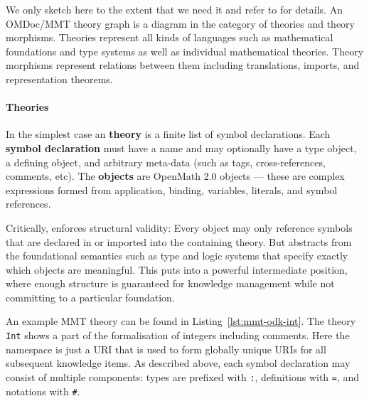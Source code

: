 We only sketch \MMT here to the extent that we need it and refer to \cite{RabKoh:WSMSML13} for details.
An OMDoc/MMT theory graph is a diagram in the category of \MMT theories and theory morphisms.
Theories represent all kinds of languages such as mathematical foundations and type systems as well as individual mathematical theories.
Theory morphisms represent relations between them including translations, imports, and representation theorems.

\paragraph{Theories}
In the simplest case an \MMT \textbf{theory} is a finite list of symbol declarations.
Each \textbf{symbol declaration} must have a name and may optionally have a type object, a defining object, and arbitrary meta-data (such as tags, cross-references, comments, etc).
The \textbf{objects} are OpenMath 2.0 objects \cite{BusCapCar:2oms04} --- these are complex expressions formed from application, binding, variables, literals, and symbol references.

Critically, \MMT enforces structural validity: Every object may only reference symbols that are declared in or imported into the containing theory.
But \MMT abstracts from the foundational semantics such as type and logic systems that specify exactly which objects are meaningful.
This puts \MMT into a powerful intermediate position, where enough structure is guaranteed for knowledge management while not committing to a particular foundation.

An example MMT theory can be found in Listing~\ref{lst:mmt-odk-int}.
The theory \texttt{Int} shows a part of the formalisation of integers including comments.
Here the namespace is just a URI that is used to form globally unique URIs for all subsequent knowledge items.
As described above, each symbol declaration may consist of multiple components: types are prefixed with \texttt{:}, definitions with \texttt{=}, and notations with \texttt{\#}.



